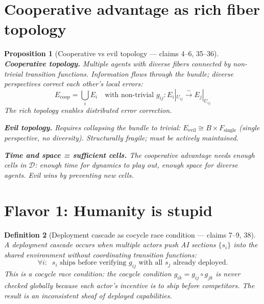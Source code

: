 \documentclass[11pt,a4paper]{article}
\newtheorem{definition}{Definition}[section]
\newtheorem{proposition}[definition]{Proposition}
\begin{document}
\section{Cooperative advantage as rich fiber topology}

\begin{proposition}[Cooperative vs evil topology --- claims 4--6, 35--36]
\label{prop:coop}
\textbf{Cooperative topology.} Multiple agents with diverse fibers
connected by non-trivial transition functions. Information flows through
the bundle; diverse perspectives correct each other's local errors:
\[
  E_{\text{coop}} = \bigcup_i E_i \quad \text{with non-trivial }
  g_{ij}: E_i|_{U_{ij}} \xrightarrow{\sim} E_j|_{U_{ij}}
\]
The rich topology enables distributed error correction.

\textbf{Evil topology.} Requires collapsing the bundle to trivial:
$E_{\text{evil}} \cong B \times F_{\text{single}}$ (single perspective,
no diversity). Structurally fragile; must be actively maintained.

\textbf{Time and space = sufficient cells.} The cooperative advantage
needs enough cells in $\mathcal{D}$: enough time for dynamics to play
out, enough space for diverse agents. Evil wins by preventing new cells.
\end{proposition}


\section{Flavor 1: Humanity is stupid}
\label{sec:human-stupid}

\begin{definition}[Deployment cascade as cocycle race condition --- claims 7--9, 38]
\label{def:cascade}
A \emph{deployment cascade} occurs when multiple actors push AI sections
$\{s_i\}$ into the shared environment without coordinating transition
functions:
\[
  \forall i: \;\; s_i \text{ ships before verifying } g_{ij}
  \text{ with all } s_j \text{ already deployed}.
\]
This is a cocycle race condition: the cocycle condition
$g_{ik} = g_{ij} \circ g_{jk}$ is never checked globally because each
actor's incentive is to ship before competitors. The result is an
inconsistent sheaf of deployed capabilities.
\end{definition}
\end{document}
